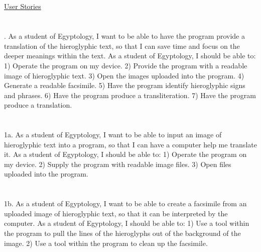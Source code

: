 \documentclass{article}
\author{Bree Kelly} \date{}
\begin{document}
\maketitle

\paragraph{} ~\\ \large
{}
\paragraph{} ~\\ \noindent
\underline{User Stories}
\paragraph{} ~\\ . As a student of Egyptology, I want to be able to have the program provide a translation of the hieroglyphic text, so that I can save time and focus on the deeper meanings within the text.
\newline \break \noindent
As a student of Egyptology, I should be able to: 1) Operate the program on my device. 2) Provide the program with a readable image of hieroglyphic text. 3) Open the images uploaded into the program. 4) Generate a readable facsimile. 5) Have the program identify hieroglyphic signs and phrases. 6) Have the program produce a transliteration. 7) Have the program produce a translation.
\paragraph{} ~\\ \noindent
1a. As a student of Egyptology, I want to be able to input an image of hieroglyphic text into a program, so that I can have a computer help me translate it.
\newline \break \noindent
As a student of Egyptology, I should be able to: 1) Operate the program on my device. 2) Supply the program with readable image files. 3) Open files uploaded into the program.
\paragraph{} ~\\ \noindent
1b. As a student of Egyptology, I want to be able to create a facsimile from an uploaded image of hieroglyphic text, so that it can be interpreted by the computer.
\newline \break \noindent
As a student of Egyptology, I should be able to: 1) Use a tool within the program to pull the lines of the hieroglyphs out of the background of the image. 2) Use a tool within the program to clean up the facsimile.
\end{document}
